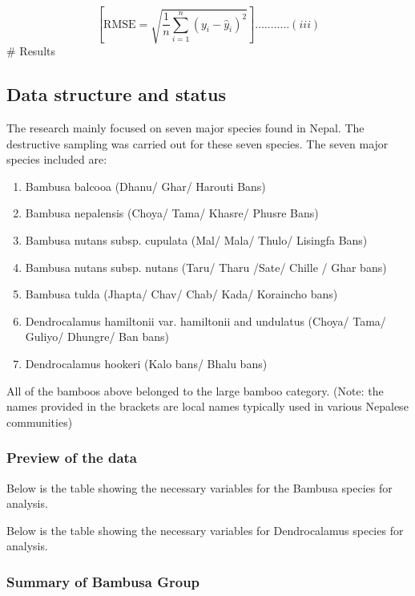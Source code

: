 \documentclass[preprint, 3p,
authoryear]{elsarticle} %
\begin{document}
\[[ \text{RMSE} = \sqrt{\frac{1}{n}\sum_{i=1}^{n}(y_i - \hat{y}_i)^2} ]...........(iii)\]
\# Results

\hypertarget{data-structure-and-status}{%
\subsection{Data structure and status}\label{data-structure-and-status}}

The research mainly focused on seven major species found in Nepal. The
destructive sampling was carried out for these seven species. The seven
major species included are:

\begin{enumerate}
\def\labelenumi{\alph{enumi})}
\item
  Bambusa balcooa (Dhanu/ Ghar/ Harouti Bans)
\item
  Bambusa nepalensis (Choya/ Tama/ Khasre/ Phusre Bans)
\item
  Bambusa nutans subsp. cupulata (Mal/ Mala/ Thulo/ Lisingfa Bans)
\item
  Bambusa nutans subsp. nutans (Taru/ Tharu /Sate/ Chille / Ghar bans)
\item
  Bambusa tulda (Jhapta/ Chav/ Chab/ Kada/ Koraincho bans)
\item
  Dendrocalamus hamiltonii var. hamiltonii and undulatus (Choya/ Tama/
  Guliyo/ Dhungre/ Ban bans)
\item
  Dendrocalamus hookeri (Kalo bans/ Bhalu bans)
\end{enumerate}

All of the bamboos above belonged to the large bamboo category. (Note:
the names provided in the brackets are local names typically used in
various Nepalese communities)

\hypertarget{preview-of-the-data}{%
\subsubsection{Preview of the data}\label{preview-of-the-data}}

Below is the table showing the necessary variables for the Bambusa
species for analysis.

Below is the table showing the necessary variables for Dendrocalamus
species for analysis.

\hypertarget{summary-of-bambusa-group}{%
\subsubsection{Summary of Bambusa
Group}\label{summary-of-bambusa-group}}
\end{document}
